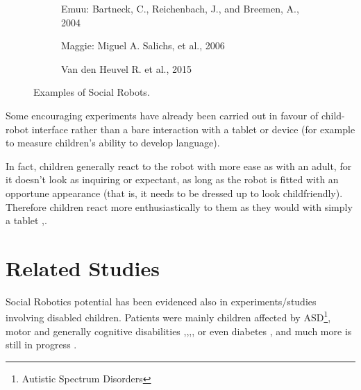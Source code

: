 \documentclass[a4paper,twoside]{book}
\begin{document}
\begin{figure}[h]
\begin{subfigure}[b]{0.3\textwidth}
  \end{subfigure}
  \begin{subfigure}[t]{0.3\textwidth}
    \caption{Emuu: Bartneck, C., Reichenbach, J., and Breemen, A., 2004}
  \end{subfigure}%
  \quad%
  \begin{subfigure}[t]{0.3\textwidth}
    \caption{Maggie: Miguel A. Salichs, et al., 2006}
  \end{subfigure}%
  \quad%
  \begin{subfigure}[t]{0.3\textwidth}
    \caption{Van den Heuvel R. et al., 2015}
  \end{subfigure}
  \caption{Examples of Social Robots.}
\end{figure}

Some encouraging experiments have already been carried out in favour of child-robot interface rather than a bare interaction with a tablet or device (for example to measure children's ability to develop language).

In fact, children generally react to the robot with more ease as with an adult, for it doesn't look as inquiring or expectant, as long as the robot is fitted with an opportune appearance (that is, it needs to be dressed up to look child\textendash friendly). Therefore children react more enthusiastically to them as they would with simply a tablet \cite{art12},\cite{art13}.

\section{Related Studies}

Social Robotics potential has been evidenced also in experiments/studies involving disabled children. Patients were mainly children affected by ASD\footnote{Autistic Spectrum Disorders}, motor and generally cognitive disabilities \cite{art1},\cite{art6},\cite{art7},\cite{art10}, or even diabetes \cite{art5}, and much more is still in progress \cite{art11}.
\end{document}
